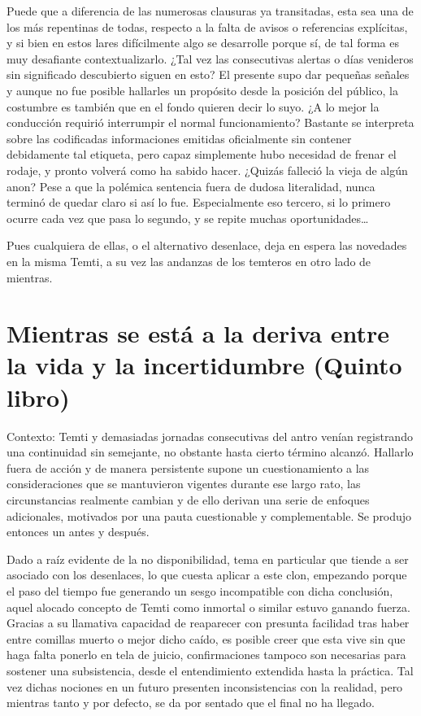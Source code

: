 \documentclass[
]{book}
\begin{document}
Puede que a diferencia de las numerosas clausuras ya transitadas, esta sea una de los más repentinas de todas, respecto a la falta de avisos o referencias explícitas, y si bien en estos lares difícilmente algo se desarrolle porque sí, de tal forma es muy desafiante contextualizarlo. ¿Tal vez las consecutivas alertas o días venideros sin significado descubierto siguen en esto? El presente supo dar pequeñas señales y aunque no fue posible hallarles un propósito desde la posición del público, la costumbre es también que en el fondo quieren decir lo suyo. ¿A lo mejor la conducción requirió interrumpir el normal funcionamiento? Bastante se interpreta sobre las codificadas informaciones emitidas oficialmente sin contener debidamente tal etiqueta, pero capaz simplemente hubo necesidad de frenar el rodaje, y pronto volverá como ha sabido hacer. ¿Quizás falleció la vieja de algún anon? Pese a que la polémica sentencia fuera de dudosa literalidad, nunca terminó de quedar claro si así lo fue. Especialmente eso tercero, si lo primero ocurre cada vez que pasa lo segundo, y se repite muchas oportunidades\ldots{}

Pues cualquiera de ellas, o el alternativo desenlace, deja en espera las novedades en la misma Temti, a su vez las andanzas de los temteros en otro lado de mientras.

\hypertarget{mientras-se-estuxe1-a-la-deriva-entre-la-vida-y-la-incertidumbre-quinto-libro}{%
\chapter{Mientras se está a la deriva entre la vida y la incertidumbre (Quinto libro)}\label{mientras-se-estuxe1-a-la-deriva-entre-la-vida-y-la-incertidumbre-quinto-libro}}

Contexto: Temti y demasiadas jornadas consecutivas del antro venían registrando una continuidad sin semejante, no obstante hasta cierto término alcanzó. Hallarlo fuera de acción y de manera persistente supone un cuestionamiento a las consideraciones que se mantuvieron vigentes durante ese largo rato, las circunstancias realmente cambian y de ello derivan una serie de enfoques adicionales, motivados por una pauta cuestionable y complementable. Se produjo entonces un antes y después.

Dado a raíz evidente de la no disponibilidad, tema en particular que tiende a ser asociado con los desenlaces, lo que cuesta aplicar a este clon, empezando porque el paso del tiempo fue generando un sesgo incompatible con dicha conclusión, aquel alocado concepto de Temti como inmortal o similar estuvo ganando fuerza. Gracias a su llamativa capacidad de reaparecer con presunta facilidad tras haber entre comillas muerto o mejor dicho caído, es posible creer que esta vive sin que haga falta ponerlo en tela de juicio, confirmaciones tampoco son necesarias para sostener una subsistencia, desde el entendimiento extendida hasta la práctica. Tal vez dichas nociones en un futuro presenten inconsistencias con la realidad, pero mientras tanto y por defecto, se da por sentado que el final no ha llegado.
\end{document}
